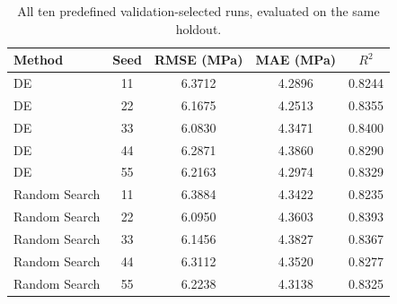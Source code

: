 \begin{table}[htbp]\centering\caption{All ten predefined validation-selected runs, evaluated on the same holdout.}\label{tab:perseed}\begin{tabularx}{\textwidth}{lCCCC}\toprule Method&Seed&RMSE (MPa)&MAE (MPa)&$R^2$\\\midrule
DE & 11 & 6.3712 & 4.2896 & 0.8244\\
DE & 22 & 6.1675 & 4.2513 & 0.8355\\
DE & 33 & 6.0830 & 4.3471 & 0.8400\\
DE & 44 & 6.2871 & 4.3860 & 0.8290\\
DE & 55 & 6.2163 & 4.2974 & 0.8329\\\midrule
Random Search & 11 & 6.3884 & 4.3422 & 0.8235\\
Random Search & 22 & 6.0950 & 4.3603 & 0.8393\\
Random Search & 33 & 6.1456 & 4.3827 & 0.8367\\
Random Search & 44 & 6.3112 & 4.3520 & 0.8277\\
Random Search & 55 & 6.2238 & 4.3138 & 0.8325\\\bottomrule\end{tabularx}\end{table}
